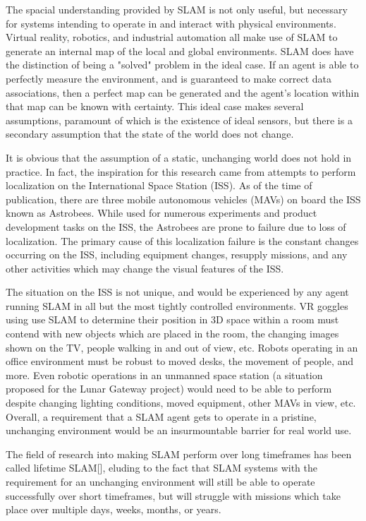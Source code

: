 The spacial understanding provided by SLAM is not only useful, but necessary for systems intending to operate in and interact with physical environments. Virtual reality, robotics, and industrial automation all make use of SLAM to generate an internal map of the local and global environments. SLAM does have the distinction of being a "solved" problem in the ideal case. If an agent is able to perfectly measure the environment, and is guaranteed to make correct data associations, then a perfect map can be generated and the agent's location within that map can be known with certainty. This ideal case makes several assumptions, paramount of which is the existence of ideal sensors, but there is a secondary assumption that the state of the world does not change.

It is obvious that the assumption of a static, unchanging world does not hold in practice. In fact, the inspiration for this research came from attempts to perform localization on the International Space Station (ISS). As of the time of publication, there are three mobile autonomous vehicles (MAVs) on board the ISS known as Astrobees. While used for numerous experiments and product development tasks on the ISS, the Astrobees are prone to failure due to loss of localization. The primary cause of this localization failure is the constant changes occurring on the ISS, including equipment changes, resupply missions, and any other activities which may change the visual features of the ISS.

The situation on the ISS is not unique, and would be experienced by any agent running SLAM in all but the most tightly controlled environments. VR goggles using use SLAM to determine their position in 3D space within a room must contend with new objects which are placed in the room, the changing images shown on the TV, people walking in and out of view, etc. Robots operating in an office environment must be robust to moved desks, the movement of people, and more. Even robotic operations in an unmanned space station (a situation proposed for the Lunar Gateway project) would need to be able to perform despite changing lighting conditions, moved equipment, other MAVs in view, etc. Overall, a requirement that a SLAM agent gets to operate in a pristine, unchanging environment would be an insurmountable barrier for real world use.

The field of research into making SLAM perform over long timeframes has been called lifetime SLAM[], eluding to the fact that SLAM systems with the requirement for an unchanging environment will still be able to operate successfully over short timeframes, but will struggle with missions which take place over multiple days, weeks, months, or years.

